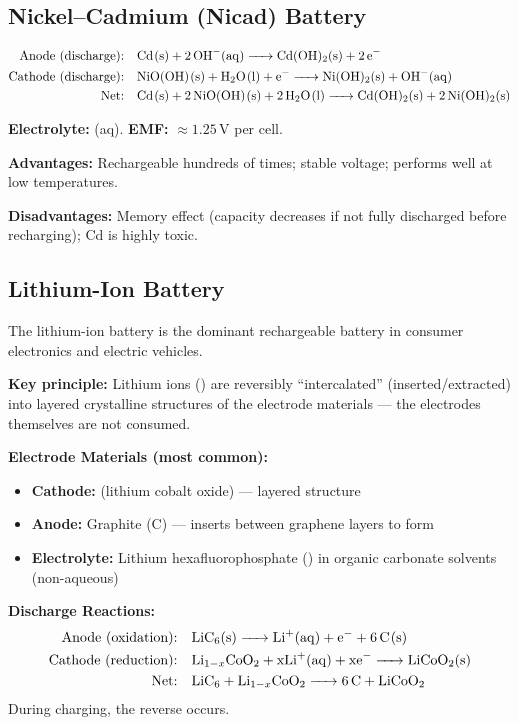 \subsection{Nickel--Cadmium (Nicad) Battery}

\begin{align*}
\text{Anode (discharge):}& \quad \ce{Cd(s) + 2OH-(aq) -> Cd(OH)2(s) + 2e-}\\
\text{Cathode (discharge):}& \quad \ce{NiO(OH)(s) + H2O(l) + e- -> Ni(OH)2(s) + OH-(aq)}\\
\text{Net:}& \quad \ce{Cd(s) + 2NiO(OH)(s) + 2H2O(l) -> Cd(OH)2(s) + 2Ni(OH)2(s)}
\end{align*}

\textbf{Electrolyte:} (aq). \textbf{EMF:} $\approx 1.25\,\text{V}$ per cell.

\textbf{Advantages:} Rechargeable hundreds of times; stable voltage; performs well at low temperatures.

\textbf{Disadvantages:} Memory effect (capacity decreases if not fully discharged before recharging); Cd is highly toxic.

\subsection{Lithium-Ion Battery}

The lithium-ion battery is the dominant rechargeable battery in consumer electronics and electric vehicles.

\begin{conceptbox}
\textbf{Key principle:} Lithium ions () are reversibly ``intercalated'' (inserted/extracted) into layered crystalline structures of the electrode materials --- the electrodes themselves are not consumed.

\textbf{Electrode Materials (most common):}
\begin{itemize}
    \item \textbf{Cathode:}  (lithium cobalt oxide) --- layered structure
    \item \textbf{Anode:} Graphite (C) ---  inserts between graphene layers to form 
    \item \textbf{Electrolyte:} Lithium hexafluorophosphate () in organic carbonate solvents (non-aqueous)
\end{itemize}

\textbf{Discharge Reactions:}
\begin{align*}
\text{Anode (oxidation):}& \quad \ce{LiC6(s) -> Li+(aq) + e- + 6C(s)}\\
\text{Cathode (reduction):}& \quad \ce{Li_{1-x}CoO2 + xLi+(aq) + xe- -> LiCoO2(s)}\\
\text{Net:}& \quad \ce{LiC6 + Li_{1-x}CoO2 -> 6C + LiCoO2}
\end{align*}
During charging, the reverse occurs.
\end{conceptbox}

